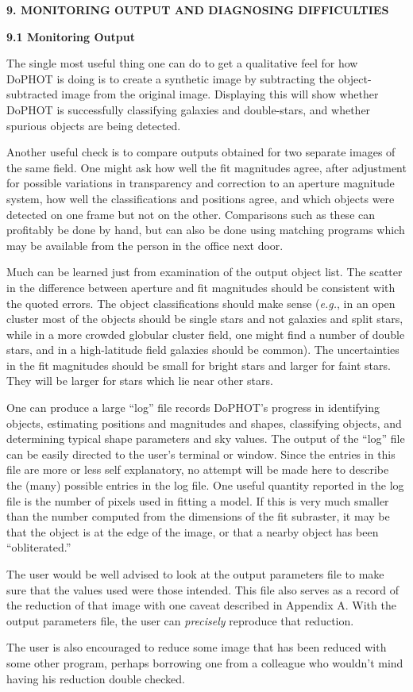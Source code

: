 \centerline{\bf 9. MONITORING OUTPUT AND DIAGNOSING DIFFICULTIES}

\centerline{\bf 9.1  Monitoring Output}

The single most useful thing one can do to get a qualitative
feel for how DoPHOT is doing is to create a synthetic image
by subtracting the object-subtracted image from the original
image.  Displaying this will show whether DoPHOT is
successfully classifying galaxies and double-stars, and
whether spurious objects are being detected.

Another useful check is to compare outputs obtained for two
separate images of the same field.  One might ask how well
the fit magnitudes agree, after adjustment for possible
variations in transparency and correction to an aperture
magnitude system, how well the classifications and positions
agree, and which objects were detected on one frame but not
on the other.  Comparisons such as these can profitably be
done by hand, but can also be done using matching programs
which may be available from the person in the office next
door.

Much can be learned just from examination of the output
object list.  The scatter in the difference between
aperture and fit magnitudes should be consistent with the
quoted errors.   The
object classifications should make sense ({\it e.g.}, in an open
cluster most of the objects should be single stars and not
galaxies and split stars, while in a more crowded globular cluster
field, one might find a number of double stars, and in a high-latitude
field galaxies should be common).  The uncertainties
in the fit magnitudes should be small for bright stars
and larger for faint stars.  They will be larger for
stars which lie near other stars.

One can produce a large ``log'' file records DoPHOT's
progress in identifying objects, estimating positions and
magnitudes and shapes, classifying objects, and determining
typical shape parameters and sky values.  The output of the 
``log'' file can be easily directed to the user's terminal or
window.  Since the entries in this file
are more or less self explanatory, no attempt will be made
here to describe the (many) possible entries in the log file.
One useful quantity reported in the log file is the number
of pixels used in fitting a model.  If this is very much
smaller than the number computed from the dimensions of the
fit subraster, it may be that the object is at the edge of
the image, or that a nearby object has been ``obliterated.''

The user would be well advised to look at the output
parameters file to make sure that the values used were those
intended.  This file also serves as a record of the
reduction of that image with one caveat described in Appendix
A.  With the output parameters file, the user can {\it
precisely} reproduce that reduction.

The user is also encouraged to reduce some image that has
been reduced with some other program, perhaps borrowing one
from a colleague who wouldn't mind having his reduction
double checked.
